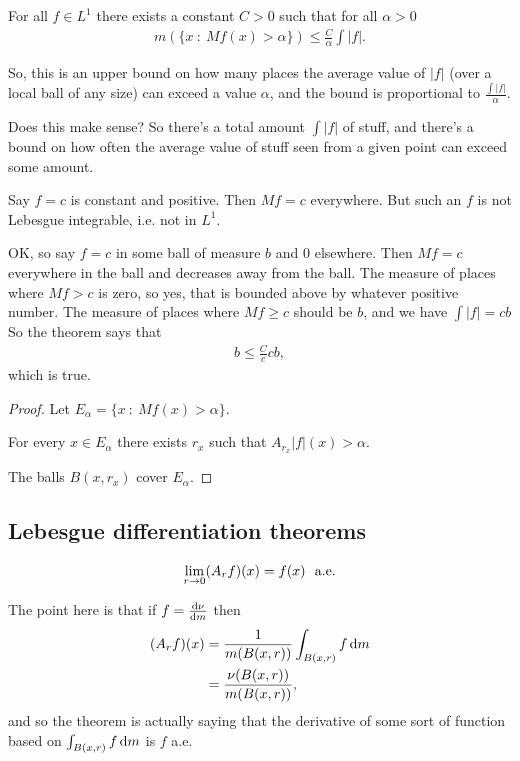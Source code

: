 \begin{theorem}
  For all $f \in L^1$ there exists a constant $C > 0$ such that for all $\alpha > 0$
  \begin{align*}
    m(\{x ~:~ M f(x) > \alpha\}) \leq \frac{C}{\alpha}\int |f|.
  \end{align*}
\end{theorem}

\begin{intuition*}
  So, this is an upper bound on how many places the average value of $|f|$ (over a local ball of any size) can
  exceed a value $\alpha$, and the bound is proportional to $\frac{\int |f|}{\alpha}$.

  Does this make sense? So there's a total amount $\int |f|$ of stuff, and there's a bound on how often the
  average value of stuff seen from a given point can exceed some amount.

  Say $f = c$ is constant and positive. Then $M f = c$ everywhere. But such an $f$ is not Lebesgue integrable,
  i.e. not in $L^1$.

  OK, so say $f = c$ in some ball of measure $b$ and $0$ elsewhere. Then $Mf = c$ everywhere in the ball and decreases away
  from the ball. The measure of places where $Mf > c$ is zero, so yes, that is bounded above by whatever
  positive number. The measure of places where $Mf \geq c$ should be $b$, and we have $\int |f| = cb$ So the theorem says that
  \begin{align*}
    b \leq \frac{C}{c} cb,
  \end{align*}
  which is true.
\end{intuition*}

\begin{proof}
  Let $E_\alpha = \{x ~:~ M f(x) > \alpha\}$.

  For every $x \in E_\alpha$ there exists $r_x$ such that $A_{r_x} |f|(x) > \alpha$.

  The balls $B(x, r_x)$ cover $E_\alpha$.


\end{proof}


\subsection{Lebesgue differentiation theorems}

\begin{theorem}\label{folland-3-18-limit-of-average}

  \begin{align*}
    \lim_{r \to 0} (A_r f)(x) = f(x) \ae
  \end{align*}
\end{theorem}
The point here is that if $f = \frac{\d\nu}{\dm}$ then
\begin{align*}
  (A_r f)(x)
  &= \frac{1}{m(B(x, r))} \int_{B(x, r)} f \dm \\
  &= \frac{\nu(B(x, r))}{m(B(x, r))},
\end{align*}
and so the theorem is actually saying that the derivative of some sort of function based on $\int_{B(x, r)} f \dm$ is $f$ a.e.


